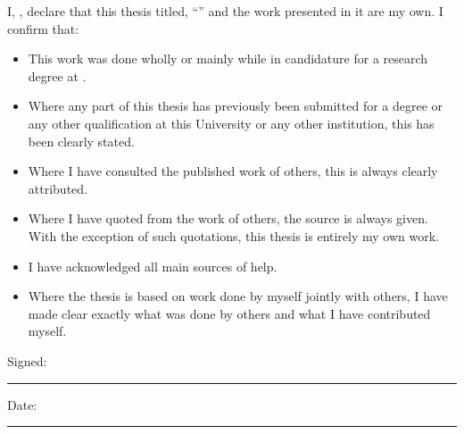\documentclass[
12pt, %
oneside, %
english, %
onehalfspacing, %
headsepline, %
]{MastersDoctoralThesis} %
\begin{document}

\begin{declaration}
\addchaptertocentry{\authorshipname} %
\noindent I, \authorname, declare that this thesis titled, \enquote{\ttitle} and the work presented in it are my own. I confirm that:

\begin{itemize} 
\item This work was done wholly or mainly while in candidature for a research degree at \univname.
\item Where any part of this thesis has previously been submitted for a degree or any other qualification at this University or any other institution, this has been clearly stated.
\item Where I have consulted the published work of others, this is always clearly attributed.
\item Where I have quoted from the work of others, the source is always given. With the exception of such quotations, this thesis is entirely my own work.
\item I have acknowledged all main sources of help.
\item Where the thesis is based on work done by myself jointly with others, I have made clear exactly what was done by others and what I have contributed myself.\\
\end{itemize}
 
\noindent Signed:\\
\rule[0.5em]{25em}{0.5pt} %
 
\noindent Date:\\
\rule[0.5em]{25em}{0.5pt} %
\end{declaration}

\cleardoublepage

%
%
%
\end{document}
